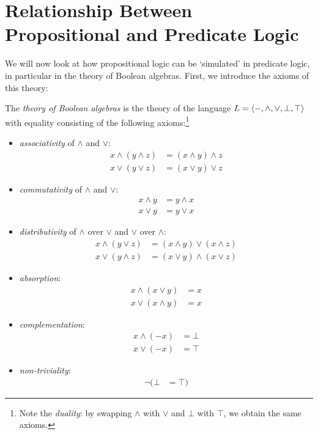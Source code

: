\section{Relationship Between Propositional and Predicate Logic}
\label{section:relationship-propositional-predicate-logic}

We will now look at how propositional logic can be `simulated' in predicate logic, in particular in the theory of Boolean algebras. First, we introduce the axioms of this theory:

\begin{definition}
    The \emph{theory of Boolean algebras} is the theory of the language $L=\langle -,{\land},{\lor},\bot,\top\rangle$ with equality consisting of the following axioms:\footnote{Note the \emph{duality}: by swapping $\land$ with $\lor$ and $\bot$ with $\top$, we obtain the same axioms.}
    \begin{multicols}{2}
        \begin{itemize}
            \item \emph{associativity} of $\land$ and $\lor$:
            \begin{align*}
                x\land(y\land z) &=(x\land y)\land z\\
                x\lor(y\lor z) &=(x\lor y)\lor z
            \end{align*}
            \item \emph{commutativity} of $\land$ and $\lor$:
            \begin{align*}
                x\land y &= y\land x\\
                x\lor y &= y\lor x
            \end{align*}
            \item \emph{distributivity} of $\land$ over $\lor$ and $\lor$ over $\land$:
            \begin{align*}
                x\land(y\lor z) &= (x\land y)\lor (x\land z)\\
                x\lor(y\land z) &= (x\lor y)\land (x\lor z)
            \end{align*}
            \item \emph{absorption}:
            \begin{align*}
                x\land(x\lor y) &= x\\
                x\lor(x\land y) &= x
            \end{align*}
            \item \emph{complementation}:
            \begin{align*}
                x\land(-x) &= \bot \\
                x\lor(-x) &= \top
            \end{align*}
            \item \emph{non-triviality}:
            \begin{align*}
                \neg (\bot &= \top)
            \end{align*}

        \end{itemize}
    \end{multicols}    
\end{definition}

